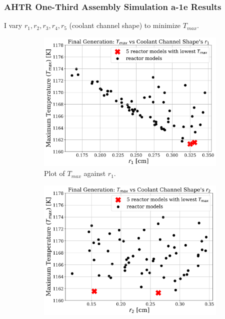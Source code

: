 \begin{frame}
    \frametitle{AHTR One-Third Assembly Simulation a-1e Results}
    I vary $r_1, r_2, r_3, r_4, r_5$ (coolant channel shape)
    to minimize $T_{max}$. 
    \begin{figure}
        \centering
        \begin{subfigure}{0.3\textwidth}
            \includegraphics[width=\linewidth]{../docs/figures/a-1e-r1.png}
            \caption{Plot of $T_{max}$ against $r_1$.}
            \label{fig:a-1e-r1} 
        \end{subfigure}
        \begin{subfigure}{0.3\textwidth}
            \includegraphics[width=\linewidth]{../docs/figures/a-1e-r2.png}

\end{subfigure}
\end{figure}
\end{frame}
